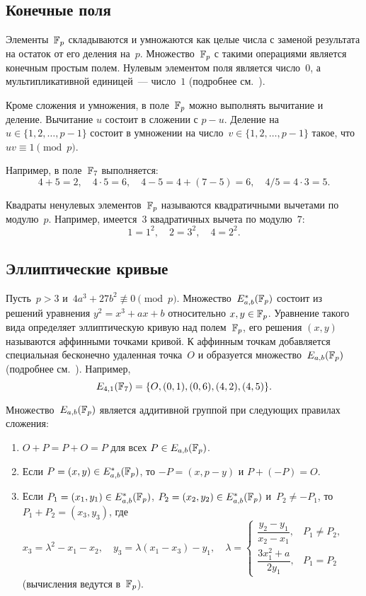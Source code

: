 \subsection{Конечные поля}

Элементы~$\mathbb{F}_p$ складываются и умножаются 
как целые числа с заменой результата на остаток от его деления на~$p$.
Множество~$\mathbb{F}_p$ с такими операциями является конечным простым полем.
Нулевым элементом поля является число~$0$,
а мультипликативной единицей~--- число~$1$
(подробнее см.~\cite{LidNid88}).

Кроме сложения и умножения, в поле~$\mathbb{F}_p$ можно выполнять вычитание и деление. 
%
Вычитание $u$ состоит в сложении с $p-u$.
%
Деление на $u\in\{1,2,\ldots,p-1\}$ состоит в 
умножении на число~$v\in\{1,2,\ldots,p-1\}$ такое, 
что $uv\equiv 1\pmod{p}$.

Например, в поле~$\mathbb{F}_7$ выполняется:
$$
4+5=2,\quad
4\cdot 5=6,\quad
4-5=4+(7-5)=6,\quad
4/5 = 4\cdot 3=5.
$$

Квадраты ненулевых элементов~$\mathbb{F}_p$ 
называются квадратичными вычетами по модулю~$p$. 
Например, имеется~$3$ квадратичных вычета по модулю~$7$:
$$
1=1^2,\quad
2=3^2,\quad
4=2^2.
$$

\subsection{Эллиптические кривые}

Пусть~$p>3$ и~$4a^3+27b^2\not\equiv 0\pmod{p}$.
Множество~$E^*_{a,b}(\mathbb{F}_p)$ состоит из решений уравнения 
$y^2=x^3+ax+b$ относительно $x,y\in\mathbb{F}_p$. 
Уравнение такого вида определяет эллиптическую кривую над полем~$\mathbb{F}_p$,
его решения $(x,y)$ называются аффинными точками кривой.
К аффинным точкам добавляется специальная бесконечно удаленная
точка~$O$ и образуется множество~$E_{a,b}(\mathbb{F}_p)$
(подробнее см.~\cite{ECC}).
Например,
$$
E_{4,1}(\mathbb{F}_{7})=\{O,(0,1),(0,6),(4,2),(4,5)\}.
$$

Множество~$E_{a,b}(\mathbb{F}_p)$ является аддитивной группой 
при следующих правилах сложения:
\begin{enumerate}
\item
$O+P=P+O=P$ для всех $P\in E_{a,b}(\mathbb{F}_p)$.

\item
Если $P=(x,y)\in E_{a,b}^*(\mathbb{F}_p)$, то $-P=(x,p-y)$ и $P+(-P)=O$.

\item
Если $P_1=(x_1,y_1)\in E_{a,b}^*(\mathbb{F}_p)$,
$P_2=(x_2,y_2)\in E_{a,b}^*(\mathbb{F}_p)$ и~$P_2\neq -P_1$, 
то $P_1+P_2=(x_3,y_3)$,
где
$
x_3=\lambda^2-x_1-x_2,\quad
y_3=\lambda(x_1-x_3)-y_1,\quad
\lambda=\left\{
\begin{array}{rl}
\dfrac{y_2-y_1}{x_2-x_1}, & P_1\neq P_2,\\[12pt]
\dfrac{3x_1^2+a}{2 y_1}, & P_1=P_2
\end{array}
\right.
$\\
(вычисления ведутся в~$\mathbb{F}_p$).
\end{enumerate}

